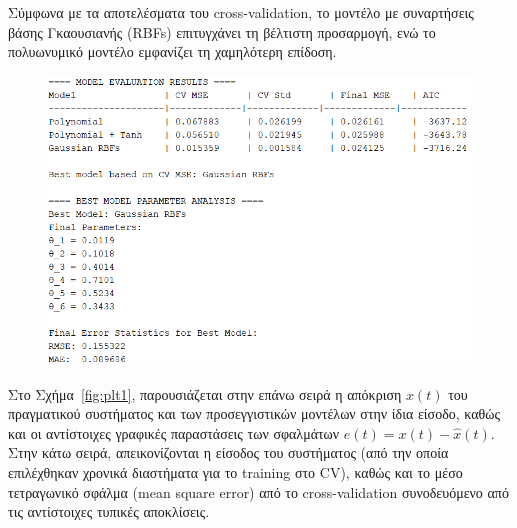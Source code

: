 \documentclass[12pt]{article} %
\numberwithin{equation}{section}  %
\begin{document}
Σύμφωνα με τα αποτελέσματα του cross-validation, 
το μοντέλο με συναρτήσεις βάσης Γκαουσιανής (RBFs) επιτυγχάνει τη βέλτιστη προσαρμογή, 
ενώ το πολυωνυμικό μοντέλο εμφανίζει τη χαμηλότερη επίδοση.

\begin{figure}[ht!]
    \centering
    \begin{minipage}{0.9\textwidth}
        \centering
        \includegraphics[width=0.7\linewidth]{plots/plotB_1_logs.png}
    \end{minipage}

    \caption{}
    \label{fig:sols}
\end{figure}

Στο Σχήμα~\ref{fig:plt1}, παρουσιάζεται στην επάνω σειρά η απόκριση $x(t)$ του πραγματικού συστήματος 
και των προσεγγιστικών μοντέλων στην ίδια είσοδο, καθώς και οι αντίστοιχες γραφικές παραστάσεις των σφαλμάτων $e(t) = x(t) - \hat{x}(t)$. 
Στην κάτω σειρά, απεικονίζονται η είσοδος του συστήματος (από την οποία επιλέχθηκαν χρονικά διαστήματα για το training στο CV), 
καθώς και το μέσο τετραγωνικό σφάλμα (mean square error) από το cross-validation συνοδευόμενο από τις αντίστοιχες τυπικές αποκλίσεις.
\end{document}
